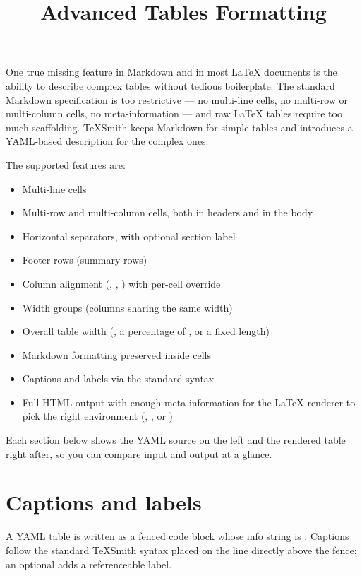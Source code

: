\documentclass[a4paper,twoside]{article}
\title{Advanced Tables Formatting}
\author{}\date{}
\begin{document}
\maketitle
One true missing feature in Markdown and in most \LaTeX{} documents is the
ability to describe complex tables without tedious boilerplate. The standard
Markdown specification is too restrictive --- no multi-line cells, no multi-row
or multi-column cells, no meta-information --- and raw \LaTeX{} tables require too
much scaffolding. TeXSmith keeps Markdown for simple tables and introduces a
YAML-based description for the complex ones.

The supported features are:
\begin{itemize}
\item Multi-line cells
\item Multi-row and multi-column cells, both in headers and in the body
\item Horizontal separators, with optional section label
\item Footer rows (summary rows)
\item Column alignment (, , ) with per-cell override
\item Width groups (columns sharing the same width)
\item Overall table width (, a percentage of , or a fixed length)
\item Markdown formatting preserved inside cells
\item Captions and labels via the standard  syntax
\item Full HTML output with enough meta-information for the \LaTeX{} renderer to
pick the right environment (, , or )
\end{itemize}
Each section below shows the YAML source on the left and the rendered table
right after, so you can compare input and output at a glance.
\section{Captions and labels}
A YAML table is written as a fenced code block whose info string is
. Captions follow the standard TeXSmith  syntax placed
on the line directly above the fence; an optional  adds a
referenceable label.
\end{document}
